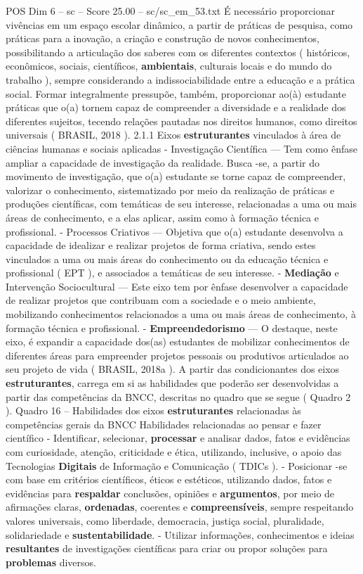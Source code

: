 \begin{textsample}{POS Dim 6 – sc – Score 25.00 – sc/sc\_em\_53.txt}
É necessário proporcionar vivências em um espaço escolar dinâmico, a partir de práticas de pesquisa, como práticas para a inovação, a criação e construção de novos conhecimentos, possibilitando a articulação dos saberes com os diferentes contextos ( históricos, econômicos, sociais, científicos, \textbf{ambientais}, culturais locais e do mundo do trabalho ), sempre considerando a indissociabilidade entre a educação e a prática social.
Formar integralmente pressupõe, também, proporcionar ao(à) estudante práticas que o(a) tornem capaz de compreender a diversidade e a realidade dos diferentes sujeitos, tecendo relações pautadas nos direitos humanos, como direitos universais ( BRASIL, 2018 ). 2.1.1 Eixos \textbf{estruturantes} vinculados à área de ciências humanas e sociais aplicadas - Investigação Científica — Tem como ênfase ampliar a capacidade de investigação da realidade.
Busca -se, a partir do movimento de investigação, que o(a) estudante se torne capaz de compreender, valorizar o conhecimento, sistematizado por meio da realização de práticas e produções científicas, com temáticas de seu interesse, relacionadas a uma ou mais áreas de conhecimento, e a elas aplicar, assim como à formação técnica e profissional. - Processos Criativos — Objetiva que o(a) estudante desenvolva a capacidade de idealizar e realizar projetos de forma criativa, sendo estes vinculados a uma ou mais áreas do conhecimento ou da educação técnica e profissional ( EPT ), e associados a temáticas de seu interesse. - \textbf{Mediação} e Intervenção Sociocultural — Este eixo tem por ênfase desenvolver a capacidade de realizar projetos que contribuam com a sociedade e o meio ambiente, mobilizando conhecimentos relacionados a uma ou mais áreas de conhecimento, à formação técnica e profissional. - \textbf{Empreendedorismo} — O destaque, neste eixo, é expandir a capacidade dos(as) estudantes de mobilizar conhecimentos de diferentes áreas para empreender projetos pessoais ou produtivos articulados ao seu projeto de vida ( BRASIL, 2018a ).
A partir das condicionantes dos eixos \textbf{estruturantes}, carrega em si as habilidades que poderão ser desenvolvidas a partir das competências da BNCC, descritas no quadro que se segue ( Quadro 2 ).
Quadro 16 – Habilidades dos eixos \textbf{estruturantes} relacionadas às competências gerais da BNCC Habilidades relacionadas ao pensar e fazer científico - Identificar, selecionar, \textbf{processar} e analisar dados, fatos e evidências com curiosidade, atenção, criticidade e ética, utilizando, inclusive, o apoio das Tecnologias \textbf{Digitais} de Informação e Comunicação ( TDICs ). - Posicionar -se com base em critérios científicos, éticos e estéticos, utilizando dados, fatos e evidências para \textbf{respaldar} conclusões, opiniões e \textbf{argumentos}, por meio de afirmações claras, \textbf{ordenadas}, coerentes e \textbf{compreensíveis}, sempre respeitando valores universais, como liberdade, democracia, justiça social, pluralidade, solidariedade e \textbf{sustentabilidade}. - Utilizar informações, conhecimentos e ideias \textbf{resultantes} de investigações científicas para criar ou propor soluções para \textbf{problemas} diversos.

\end{textsample}
